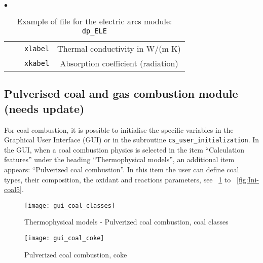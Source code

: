 {{{\begin{list}{$\bullet$}{}
\begin{table}[htbp]
\begin{center}
{\begin{tabular}{|c|l|c|c|}
        &                    &    \texttt{xlabel}               & Thermal conductivity in W/(m K)                    \\
        &                    &    \texttt{xkabel\index{xkabel}} & Absorption coefficient (radiation)                 \\   \hline
\end{tabular}
}
\caption{Example of file for the electric arcs module:
 \texttt{dp\_ELE}}\label{tab:dpELE}
\end{center}
\end{table}

\end{list}

\clearpage


\subsection[Pulverised coal and gas combustion module]
{Pulverised coal and gas combustion module (needs update)}
\label{sec:Ini-coal}
For coal combustion, it is possible to initialise the specific variables in the Graphical User Interface (GUI) or in the subroutine
\texttt{cs\_user\_initialization}. In the GUI, when a coal combustion physics is selected in the item ``Calculation features'' under the heading
``Thermophysical models'', an additional item appears: ``Pulverized coal combustion''. In this item the user can define coal types, their composition, the oxidant and reactions parameters, see \figurename~\ref{fig:Ini-coal1} to \figurename~\ref{fig:Ini-coal5}.

\begin{figure}[!ht]
\begin{center}
\texttt{[image: gui\_coal\_classes]}
\caption{Thermophysical models - Pulverized coal combustion, coal classes}
\label{fig:Ini-coal1}
\end{center}
\end{figure}

\begin{figure}[!ht]
\begin{center}
\texttt{[image: gui\_coal\_coke]}
\caption{Pulverized coal combustion, coke}
\label{fig:Ini-coal2}
\end{center}
\end{figure}

}}}
